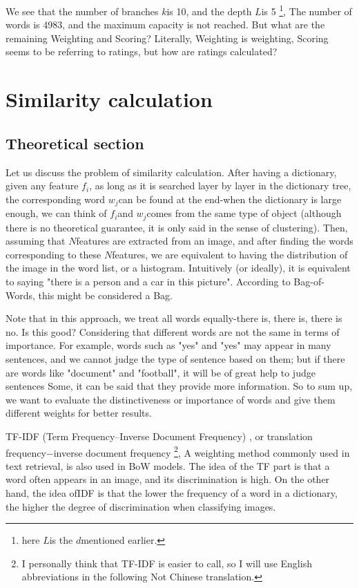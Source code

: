 We see that the number of branches $k $is 10, and the depth $L $is 5 \footnote{here $L $is the $d $mentioned earlier. }, The number of words is 4983, and the maximum capacity is not reached. But what are the remaining Weighting and Scoring? Literally, Weighting is weighting, Scoring seems to be referring to ratings, but how are ratings calculated?

\section{Similarity calculation}
\subsection{Theoretical section}
Let us discuss the problem of similarity calculation. After having a dictionary, given any feature $f_i $, as long as it is searched layer by layer in the dictionary tree, the corresponding word $w_j $can be found at the end-when the dictionary is large enough, we can think of $f_i $and $w_j $comes from the same type of object (although there is no theoretical guarantee, it is only said in the sense of clustering). Then, assuming that $N $features are extracted from an image, and after finding the words corresponding to these $N $features, we are equivalent to having the distribution of the image in the word list, or a histogram. Intuitively (or ideally), it is equivalent to saying "there is a person and a car in this picture". According to Bag-of-Words, this might be considered a Bag.

Note that in this approach, we treat all words equally-there is, there is, there is no. Is this good? Considering that different words are not the same in terms of importance. For example, words such as "yes" and "yes" may appear in many sentences, and we cannot judge the type of sentence based on them; but if there are words like "document" and "football", it will be of great help to judge sentences Some, it can be said that they provide more information. So to sum up, we want to evaluate the distinctiveness or importance of words and give them different weights for better results.

TF-IDF (Term Frequency–Inverse Document Frequency) \textsuperscript{\cite{Sivic2003, Robertson2004}}, or translation frequency−inverse document frequency \footnote{I personally think that TF-IDF is easier to call, so I will use English abbreviations in the following Not Chinese translation. }, A weighting method commonly used in text retrieval, is also used in BoW models. The idea of ​​the TF part is that a word often appears in an image, and its discrimination is high. On the other hand, the idea of ​​IDF is that the lower the frequency of a word in a dictionary, the higher the degree of discrimination when classifying images.

